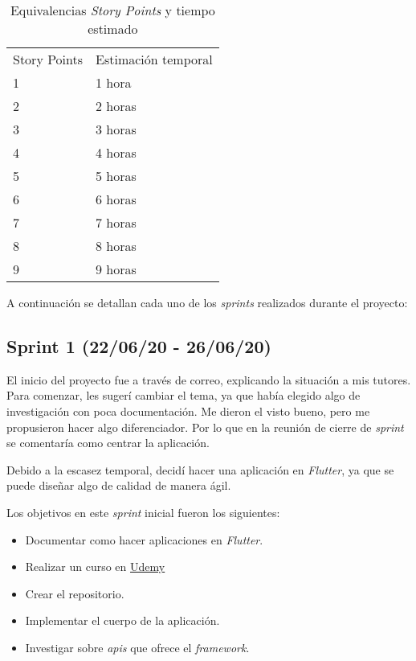 \begin{table}[H]
	\centering
	\begin{tabular}{l l }
		\toprule
		{Story Points} & Estimación temporal \\
		1            & 1 hora              \\ 
		2            & 2 horas           \\ 
		3            & 3 horas             \\ 
		4            & 4 horas           \\ 
		5            & 5 horas             \\ 
		6            & 6 horas           \\ 
		7            & 7 horas             \\ 
		8            & 8 horas             \\ 
		9            & 9 horas             \\ \bottomrule
	\end{tabular}
	\caption{Equivalencias \emph{Story Points} y tiempo estimado}
	\label{tabla:storypoint}
\end{table}

A continuación se detallan cada uno de los \emph{sprints} realizados durante el proyecto:

\subsection{Sprint 1 (22/06/20 - 26/06/20)}\label{sprint-1-220620---260620}

El inicio del proyecto fue a través de correo, explicando la situación a mis tutores. Para comenzar, les sugerí cambiar el tema, ya que había elegido algo de investigación con poca documentación. Me dieron el visto bueno, pero me propusieron hacer algo diferenciador. Por lo que en la reunión de cierre de \emph{sprint} se comentaría como centrar la aplicación. 

Debido a la escasez temporal, decidí hacer una aplicación en \emph{Flutter}, ya que se puede diseñar algo de calidad de manera ágil.

Los objetivos en este \emph{sprint} inicial fueron los siguientes:

\begin{itemize}
\item Documentar como hacer aplicaciones en \emph{Flutter}.
\item Realizar un curso en \href{https://www.udemy.com/course/flutter-primeros-pasos/}{Udemy}
\item Crear el repositorio.
\item Implementar el cuerpo de la aplicación.
\item Investigar sobre \emph{apis} que ofrece el \emph{framework}.
\end{itemize}

